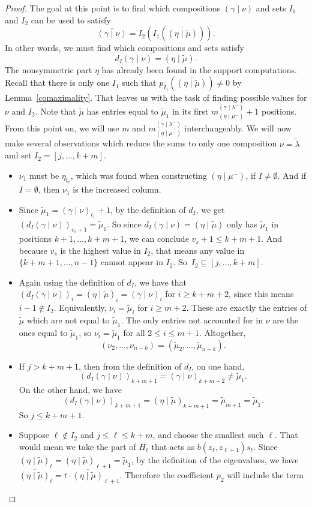 \documentclass[ALCO]{cedram}
\newcommand{\gammalambdamin}{{(\gamma \mid \lambda^-)}}
\newcommand{\gammanu}{{(\gamma \mid \nu)}}
\newcommand{\etamu}{{(\eta \mid \mu^-)}}
\newcommand{\mutilde}{{\widetilde{\mu}}}
\newcommand{\lambdatilde}{{\widetilde{\lambda}}}
\newcommand{\etamutilde}{{(\eta \mid \widetilde{\mu})}}
\newcommand{\mIone}{m_{\etamu}^{\gammalambdamin}}
\newcommand{\dI}{d_I}
\begin{document}
\begin{proof}
The goal at this point is to find which compositions $\gammanu$ and sets $I_1$ and $I_2$ can be used to satisfy
\[\overline{\gammanu} = I_2\left(I_1\left(\overline{\etamutilde}\right)\right). \]
In other words, we must find which compositions and sets satisfy
\[\dI\gammanu = \etamutilde. \]
The nonsymmetric part $\eta$ has already been found in the support computations. Recall that there is only one $I_1$ such that $p_{I_1}\left(\overline{\etamutilde}\right) \neq 0$ by Lemma~\ref{comaximality}. That leaves us with the task of finding possible values for $\nu$ and $I_2$.
 Note that $\mutilde$ has entries equal to $\mutilde_1$ in its first $\mIone+1$ positions. From this point on, we will use $m$ and $\mIone$ interchangeably. We will now make several observations which reduce the sums to only one composition $\nu=\lambdatilde$ and set $I_2=[j, \dotsc,k+m]$. 
\begin{itemize}
    \item $\nu_1$ must be $\eta_{t_r}$, which was found when constructing $\etamu$, if $I \neq \emptyset$. And if $I=\emptyset$, then $\nu_1$ is the increased column.
    \item Since $\mutilde_1 = \gammanu_{t_1}+1$, by the definition of $\dI$, we get $(\dI \gammanu)_{v_s+1} = \mutilde_1$. So since $\dI \gammanu = \etamutilde$ only has $\mutilde_1$ in positions $k+1, \dots, k+m+ 1$, we can conclude $v_s+1 \leq k+ m + 1$. And because $v_s$ is the highest value in $I_2$, that means any value in $\{k+m+1, \dotsc, n-1\}$ cannot appear in $I_2$. So~$I_2 \subseteq [j, \dotsc, k+m]$.
    \item Again using the definition of $d_I$, we have that $(\dI \gammanu)_i = \etamutilde_i = \gammanu_i$ for $i\geq k+m+2$, since this means $i-1 \notin I_2$. Equivalently, $\nu_i = \mutilde_i$ for $i\geq m+2$. These are exactly the entries of $\mutilde$ which are not equal to $\mutilde_1$. The only entries not accounted for in $\nu$ are the ones equal to $\mutilde_1$, so $\nu_i = \mutilde_1$ for all $2\leq i \leq m + 1$.  Altogether,
    \[ (\nu_2, \dotsc, \nu_{n-k}) = (\mutilde_2, \dotsc, \mutilde_{n-k}).\]
    \item If $j>k+m + 1$, then from the definition of $\dI$, on one hand, \[(\dI \gammanu)_{k+m+1}=\gammanu_{k+m+2} \neq \mutilde_1.\]
    On the other hand, we have
    \[ (\dI \gammanu)_{k+m+1} = \etamutilde_{k+m + 1} = \mutilde_{m+1} = \mutilde_1.\]
    So $j\leq k+m+1$.
    \item Suppose $\ell \notin I_2$ and $j \leq \ell \leq k+m$, and choose the smallest such $\ell$. That would mean we take the part of $H_\ell$ that acts as $b(z_\ell, z_{\ell+1}) s_\ell$. Since $\etamutilde_\ell = \etamutilde_{\ell+1}=\mutilde_1$, by the definition of the eigenvalues, we have $\overline{\etamutilde}_\ell = t\cdot \overline{\etamutilde}_{\ell+1}$. Therefore the coefficient $p_2$ will include the term 

\end{itemize}
\end{proof}
\end{document}
